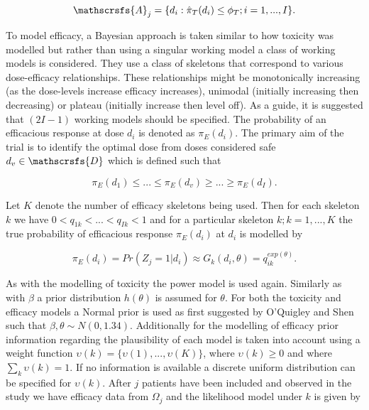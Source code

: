 \begin{equation}
	\mathscrsfs{A}_j = \{d_i : \hat{\pi}_T(d_i)  \leq \phi_T ; i = 1,...,I \}.
\end{equation} 

To model efficacy, a Bayesian approach is taken similar to how toxicity was modelled but rather than using a singular working model a class of working models is considered. They use a class of skeletons that correspond to various dose-efficacy relationships. These relationships might be monotonically increasing (as the dose-levels increase efficacy increases), unimodal (initially increasing then decreasing) or plateau (initially increase then level off). As a guide, it is suggested that $(2I-1)$ working models should be specified. The probability of an efficacious response at dose $d_i$ is denoted as $\pi_E(d_i)$. The primary aim of the trial is to identify the optimal dose from doses considered safe $d_v \in \mathscrsfs{D}$ which is defined such that 

\begin{equation}
	\pi_E(d_1) \leq ... \leq \pi_E(d_v) \geq ... \geq \pi_E(d_I). 
\end{equation}

Let $K$ denote the number of efficacy skeletons being used. Then for each skeleton $k$ we have $0 < q_{1k} < ... <q_{Ik} <1$ and for a particular skeleton $k; k = 1,...,K$ the true probability of efficacious response $\pi_E(d_i)$ at $d_i$ is modelled by 

\begin{equation}
	\pi_E(d_i) = Pr(Z_j = 1|d_i) \approx G_k(d_i,\theta) = q_{ik} ^{exp(\theta)}.
\end{equation}

As with the modelling of toxicity the power model is used again. Similarly as with $\beta$ a prior distribution $h(\theta)$ is assumed for $\theta$. For both the toxicity and efficacy models a Normal prior is used as first suggested by O'Quigley and Shen \cite{oquigleyContinualReassessmentMethod1996} such that $\beta, \theta \sim N(0,1.34)$. Additionally for the modelling of efficacy prior information regarding the plausibility of each model is taken into account using a weight function $\upsilon(k) = \{\upsilon(1), ..., \upsilon(K)\}$, where $\upsilon(k) \geq 0$ and where $\sum_k \upsilon(k) = 1$. If no information is available a discrete uniform distribution can be specified for $\upsilon(k)$. After $j$ patients have been included and observed in the study we have efficacy data from $\Omega_j$ and the likelihood model under $k$ is given by 

